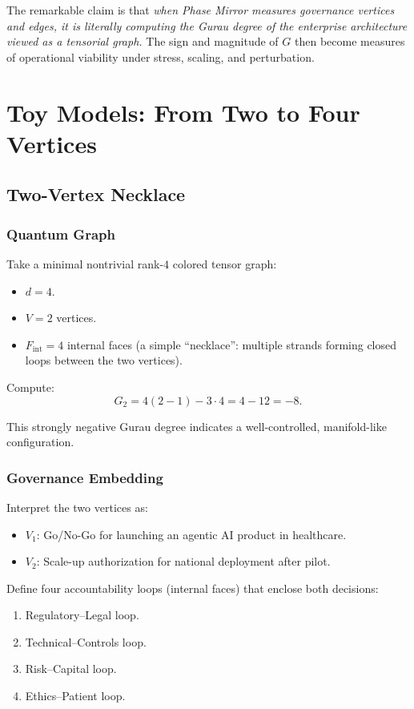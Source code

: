 \documentclass[11pt]{article}
\begin{document}
The remarkable claim is that \emph{when Phase Mirror measures governance vertices and edges, it is literally computing the Gurau degree of the enterprise architecture viewed as a tensorial graph.} The sign and magnitude of \(G\) then become measures of operational viability under stress, scaling, and perturbation.

\section{Toy Models: From Two to Four Vertices}

\subsection{Two-Vertex Necklace}

\subsubsection{Quantum Graph}

Take a minimal nontrivial rank-\(4\) colored tensor graph:
\begin{itemize}
  \item \(d = 4\).
  \item \(V = 2\) vertices.
  \item \(F_{\text{int}} = 4\) internal faces (a simple ``necklace'': multiple strands forming closed loops between the two vertices).
\end{itemize}

Compute:
\[
G_{2} = 4(2 - 1) - 3 \cdot 4 = 4 - 12 = -8.
\]

This strongly negative Gurau degree indicates a well-controlled, manifold-like configuration.

\subsubsection{Governance Embedding}

Interpret the two vertices as:
\begin{itemize}
  \item \(V_1\): Go/No-Go for launching an agentic AI product in healthcare.
  \item \(V_2\): Scale-up authorization for national deployment after pilot.
\end{itemize}

Define four accountability loops (internal faces) that enclose both decisions:
\begin{enumerate}
  \item Regulatory–Legal loop.
  \item Technical–Controls loop.
  \item Risk–Capital loop.
  \item Ethics–Patient loop.
\end{enumerate}
\end{document}
